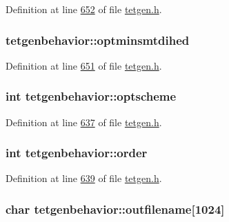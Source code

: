 Definition at line \hyperlink{tetgen_8h_source_l00652}{652} of file \hyperlink{tetgen_8h_source}{tetgen.\+h}.

\subsubsection[{\texorpdfstring{optminsmtdihed}{optminsmtdihed}}]{ tetgenbehavior\+::optminsmtdihed}\hypertarget{classtetgenbehavior_a3f4246164c85bd2d1f88ed4e9c739398}{}\label{classtetgenbehavior_a3f4246164c85bd2d1f88ed4e9c739398}


Definition at line \hyperlink{tetgen_8h_source_l00651}{651} of file \hyperlink{tetgen_8h_source}{tetgen.\+h}.

\subsubsection[{\texorpdfstring{optscheme}{optscheme}}]{\setlength{\rightskip}{0pt plus 5cm}int tetgenbehavior\+::optscheme}\hypertarget{classtetgenbehavior_a4e5be08acac6b661a03e57efedd83ac9}{}\label{classtetgenbehavior_a4e5be08acac6b661a03e57efedd83ac9}


Definition at line \hyperlink{tetgen_8h_source_l00637}{637} of file \hyperlink{tetgen_8h_source}{tetgen.\+h}.

\subsubsection[{\texorpdfstring{order}{order}}]{\setlength{\rightskip}{0pt plus 5cm}int tetgenbehavior\+::order}\hypertarget{classtetgenbehavior_a47550f681968e6674f3c78b395d59df8}{}\label{classtetgenbehavior_a47550f681968e6674f3c78b395d59df8}


Definition at line \hyperlink{tetgen_8h_source_l00639}{639} of file \hyperlink{tetgen_8h_source}{tetgen.\+h}.

\subsubsection[{\texorpdfstring{outfilename}{outfilename}}]{\setlength{\rightskip}{0pt plus 5cm}char tetgenbehavior\+::outfilename\mbox{[}1024\mbox{]}}\hypertarget{classtetgenbehavior_aa066e0b8f2b5b3d0f9e5c6b74e8eadc4}{}\label{classtetgenbehavior_aa066e0b8f2b5b3d0f9e5c6b74e8eadc4}



